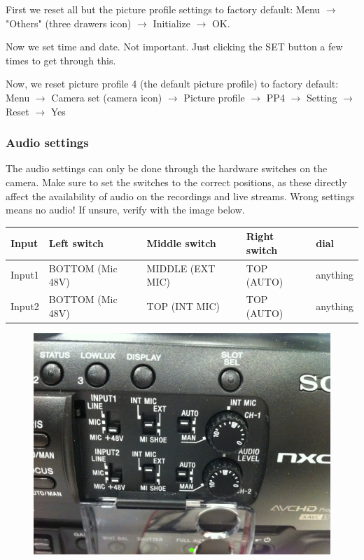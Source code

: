 \documentclass{article}
\begin{document}
First we reset all but the picture profile settings to factory default:
Menu $\rightarrow$ "Others" (three drawers icon) $\rightarrow$ Initialize $\rightarrow$ OK.

Now we set time and date. Not important. Just clicking the SET button a few times to get through this.

Now, we reset picture profile 4 (the default picture profile) to factory default:
Menu $\rightarrow$ Camera set (camera icon) $\rightarrow$ Picture profile $\rightarrow$ PP4 $\rightarrow$ Setting $\rightarrow$ Reset $\rightarrow$ Yes

\subsubsection{Audio settings}
The audio settings can only be done through the hardware switches on the camera.
Make sure to set the switches to the correct positions, as these directly affect the availability of audio on the recordings and live streams. Wrong settings means no audio!
If unsure, verify with the image below.

\begin{tabular}{| l || l | l | l | l |}
Input & Left switch & Middle switch & Right switch & dial \\ \hline
Input1 & BOTTOM (Mic 48V) & MIDDLE (EXT MIC) & TOP (AUTO) & anything \\
Input2 & BOTTOM (Mic 48V) & TOP (INT MIC) & TOP (AUTO) & anything \\
\end{tabular}

\begin{figure}[H]
  \centering
\includegraphics[width = 120mm]{sony_audio_settings.jpg}
\end{figure}
\end{document}
